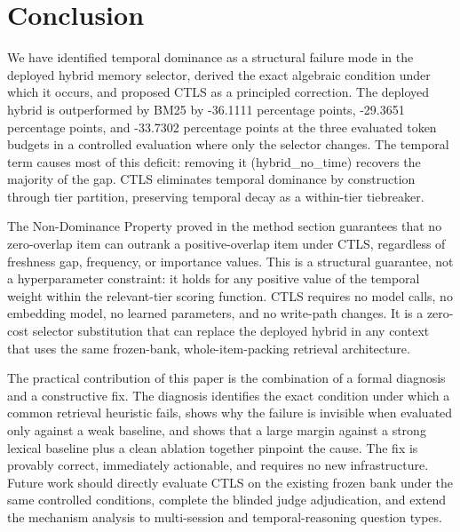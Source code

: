 \section{Conclusion}

\label{sec:conclusion}

We have identified temporal dominance as a structural failure mode in the deployed hybrid memory selector, derived the exact algebraic condition under which it occurs, and proposed CTLS as a principled correction. The deployed hybrid is outperformed by BM25 by -36.1111 percentage points, -29.3651 percentage points, and -33.7302 percentage points at the three evaluated token budgets in a controlled evaluation where only the selector changes. The temporal term causes most of this deficit: removing it (hybrid\_no\_time) recovers the majority of the gap. CTLS eliminates temporal dominance by construction through tier partition, preserving temporal decay as a within-tier tiebreaker.

The Non-Dominance Property proved in the method section guarantees that no zero-overlap item can outrank a positive-overlap item under CTLS, regardless of freshness gap, frequency, or importance values. This is a structural guarantee, not a hyperparameter constraint: it holds for any positive value of the temporal weight within the relevant-tier scoring function. CTLS requires no model calls, no embedding model, no learned parameters, and no write-path changes. It is a zero-cost selector substitution that can replace the deployed hybrid in any context that uses the same frozen-bank, whole-item-packing retrieval architecture.

The practical contribution of this paper is the combination of a formal diagnosis and a constructive fix. The diagnosis identifies the exact condition under which a common retrieval heuristic fails, shows why the failure is invisible when evaluated only against a weak baseline, and shows that a large margin against a strong lexical baseline plus a clean ablation together pinpoint the cause. The fix is provably correct, immediately actionable, and requires no new infrastructure. Future work should directly evaluate CTLS on the existing frozen bank under the same controlled conditions, complete the blinded judge adjudication, and extend the mechanism analysis to multi-session and temporal-reasoning question types.
